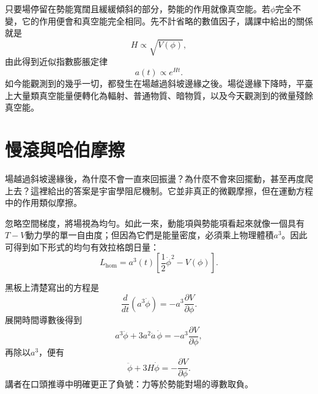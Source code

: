 只要場停留在勢能寬闊且緩緩傾斜的部分，勢能的作用就像真空能。若\(\phi\)完全不變，它的作用便會和真空能完全相同。先不計省略的數值因子，講課中給出的關係就是
\begin{equation}
H\propto \sqrt{V(\phi)},
\end{equation}
由此得到近似指數膨脹定律
\begin{equation}
a(t)\propto e^{Ht}.
\end{equation}
如今能觀測到的幾乎一切，都發生在場越過斜坡邊緣之後。場從邊緣下降時，平臺上大量類真空能量便轉化為輻射、普通物質、暗物質，以及今天觀測到的微量殘餘真空能。

\begin{classroomqa}
\end{classroomqa}

\begin{classroomqa}
\end{classroomqa}

\section{慢滾與哈伯摩擦}

場越過斜坡邊緣後，為什麼不會一直來回振盪？為什麼不會來回擺動，甚至再度爬上去？這裡給出的答案是宇宙學阻尼機制。它並非真正的微觀摩擦，但在運動方程中的作用類似摩擦。

忽略空間梯度，將場視為均勻。如此一來，動能項與勢能項看起來就像一個具有\(T-V\)動力學的單一自由度；但因為它們是能量密度，必須乘上物理體積\(a^3\)。因此可得到如下形式的均勻有效拉格朗日量：
\begin{equation}
L_{\mathrm{hom}}=a^3(t)\left[\frac12\dot\phi^2-V(\phi)\right].
\end{equation}

黑板上清楚寫出的方程是
\begin{equation}
\frac{d}{dt}\left(a^3\dot\phi\right)=-a^3\frac{\partial V}{\partial\phi}.
\end{equation}
展開時間導數後得到
\begin{equation}
a^3\ddot\phi+3a^2\dot a\,\dot\phi=-a^3\frac{\partial V}{\partial\phi},
\end{equation}
再除以\(a^3\)，便有
\begin{equation}
\ddot\phi+3H\dot\phi=-\frac{\partial V}{\partial\phi}.
\end{equation}
講者在口頭推導中明確更正了負號：力等於勢能對場的導數取負。


